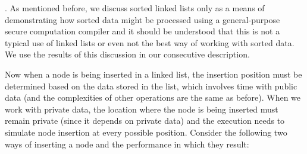 \documentclass[11pt]{article}
\begin{document}
\medskip {}. As mentioned before, we
discuss sorted linked lists only as a means of demonstrating how sorted data
might be processed using a general-purpose secure computation compiler and
it should be understood that this is not a typical use of linked lists or
even not the best way of working with sorted data. We use the results of
this discussion in our consecutive description.

Now when a node is being inserted in a linked list, the insertion position
must be determined based on the data stored in the list, which involves
 time with public data (and the complexities of other operations are
the same as before). When we work with private data, the location where the
node is being inserted must remain private (since it depends on private
data) and the execution needs to simulate node insertion at every possible
position. Consider the following two ways of inserting a node and the
performance in which they result:
\end{document}
